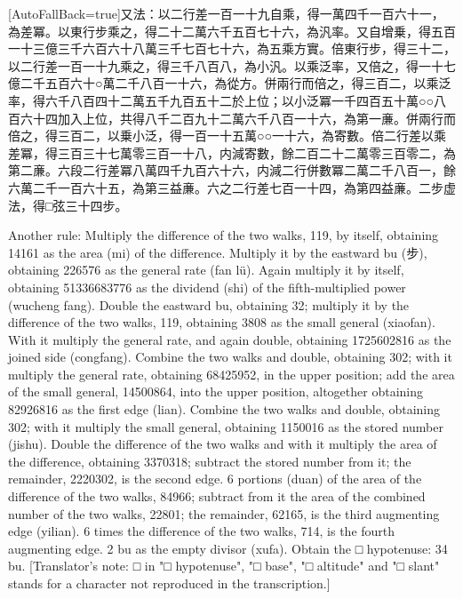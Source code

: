 \documentclass[11pt]{article}
\newcommand{\unitlabel}[1]{\marginpar{\raggedleft\tiny\color{gray}#1}}
\newenvironment{unitzh}{\par\CJKfontspec{Noto Serif CJK SC}[AutoFallBack=true]\large\linespread{1.25}\selectfont}{\par}
\newenvironment{uniten}{\par\small\color{black!85}}{\par\medskip}
\begin{document}
\begin{unitzh}\unitlabel{ceyuan-021.1}又法：以二行差一百一十九自乘，得一萬四千一百六十一，為差冪。以東行步乘之，得二十二萬六千五百七十六，為汎率。又自增乗，得五百一十三億三千六百六十八萬三千七百七十六，為五乘方實。倍東行步，得三十二，以二行差一百一十九乘之，得三千八百八，為小汎。以乘泛率，又倍之，得一十七億二千五百六十○萬二千八百一十六，為從方。併兩行而倍之，得三百二，以乘泛率，得六千八百四十二萬五千九百五十二於上位；以小泛冪一千四百五十萬○○八百六十四加入上位，共得八千二百九十二萬六千八百一十六，為第一亷。併兩行而倍之，得三百二，以乗小泛，得一百一十五萬○○一十六，為寄數。倍二行差以乘差冪，得三百三十七萬零三百一十八，内減寄數，餘二百二十二萬零三百零二，為第二亷。六段二行差冪八萬四千九百六十六，内減二行併數冪二萬二千八百一，餘六萬二千一百六十五，為第三益亷。六之二行差七百一十四，為第四益亷。二步虚法，得□弦三十四步。\end{unitzh}
\begin{uniten}Another rule: Multiply the difference of the two walks, 119, by itself, obtaining 14161 as the area (mi) of the difference. Multiply it by the eastward bu (步), obtaining 226576 as the general rate (fan lü). Again multiply it by itself, obtaining 51336683776 as the dividend (shi) of the fifth-multiplied power (wucheng fang). Double the eastward bu, obtaining 32; multiply it by the difference of the two walks, 119, obtaining 3808 as the small general (xiaofan). With it multiply the general rate, and again double, obtaining 1725602816 as the joined side (congfang). Combine the two walks and double, obtaining 302; with it multiply the general rate, obtaining 68425952, in the upper position; add the area of the small general, 14500864, into the upper position, altogether obtaining 82926816 as the first edge (lian). Combine the two walks and double, obtaining 302; with it multiply the small general, obtaining 1150016 as the stored number (jishu). Double the difference of the two walks and with it multiply the area of the difference, obtaining 3370318; subtract the stored number from it; the remainder, 2220302, is the second edge. 6 portions (duan) of the area of the difference of the two walks, 84966; subtract from it the area of the combined number of the two walks, 22801; the remainder, 62165, is the third augmenting edge (yilian). 6 times the difference of the two walks, 714, is the fourth augmenting edge. 2 bu as the empty divisor (xufa). Obtain the □ hypotenuse: 34 bu. [Translator's note: □ in "□ hypotenuse", "□ base", "□ altitude" and "□ slant" stands for a character not reproduced in the transcription.]\end{uniten}
\end{document}
